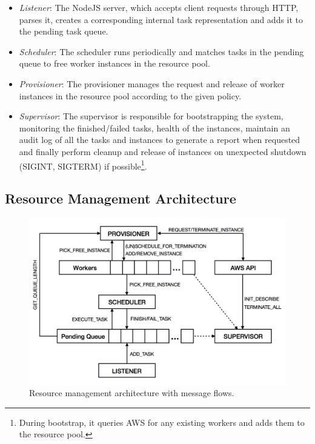 \documentclass[a4paper]{IEEEtran}
\begin{document}
 \begin{itemize}
   \item \emph{Listener}: The NodeJS server, which accepts client requests through HTTP, parses it, creates a 
   corresponding internal task representation and adds it to the pending task queue.
   \item \emph{Scheduler}: The scheduler runs periodically and matches tasks in the pending queue to free
   worker instances in the resource pool.
   \item \emph{Provisioner}: The provisioner manages the request and release of worker instances in the resource 
   pool according to the given policy.
   \item \emph{Supervisor}: The supervisor is responsible for bootstrapping the system, monitoring the finished/failed tasks, health of the instances, maintain an audit log of all the tasks and instances to generate a report when requested and finally perform cleanup and release of instances on unexpected shutdown (SIGINT, SIGTERM)
   if possible\footnote{During bootstrap, it queries AWS for any existing workers and adds them to the resource pool.}.
 \end{itemize}

\subsection{Resource Management Architecture}
 
\begin{figure}[bp]
  \centering
    \includegraphics[width=\columnwidth]{resource-management.png}
  \caption{Resource management architecture with message flows.}
  \label{fig:resource_management}
\end{figure}
\end{document}

